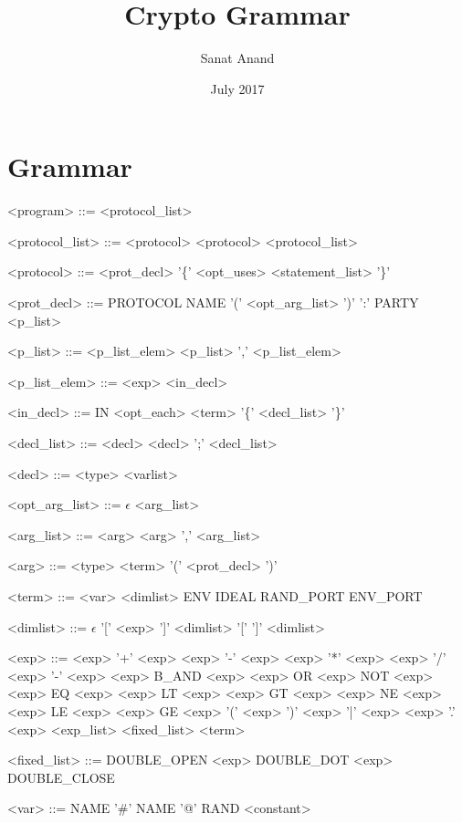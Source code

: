 \documentclass{article}
\title{Crypto Grammar}
\author{Sanat Anand}
\date{July 2017}
\begin{document}
\maketitle

\setlength{\grammarparsep}{4pt plus 1pt minus 1pt} %
\setlength{\grammarindent}{12em} %

\section{Grammar}

\begin{grammar}
<program> ::= <protocol\_list>

<protocol\_list> ::= <protocol> \alt <protocol> <protocol\_list>

<protocol> ::= <prot\_decl> '\{' <opt\_uses> <statement\_list> '\}'

<prot\_decl> ::= PROTOCOL NAME '(' <opt\_arg\_list> ')' ':' PARTY <p\_list>

<p\_list> ::= <p\_list\_elem> \alt <p\_list> ',' <p\_list\_elem>

<p\_list\_elem> ::= <exp> \alt <in\_decl>

<in\_decl> ::= IN <opt\_each> <term> '\{' <decl\_list> '\}'

<decl\_list> ::= <decl> \alt <decl> ';' <decl\_list>

<decl> ::= <type> <varlist>

<opt\_arg\_list> ::= $\epsilon$ \alt <arg\_list>

<arg\_list> ::= <arg> \alt <arg> ',' <arg\_list>

<arg> ::= <type> <term> \alt '(' <prot\_decl> ')'

<term> ::= <var> <dimlist> \alt ENV \alt IDEAL \alt RAND\_PORT \alt ENV\_PORT

<dimlist> ::= $\epsilon$ \alt '[' <exp> ']' <dimlist> \alt '[' ']' <dimlist>

<exp> ::= <exp> '+' <exp> \alt <exp> '-' <exp> \alt <exp> '*' <exp> \alt <exp> '/' <exp> \alt '-' <exp> \alt <exp> B\_AND <exp> \alt <exp> OR <exp> \alt NOT <exp> \alt <exp> EQ <exp> \alt <exp> LT <exp> \alt <exp> GT <exp> \alt <exp> NE <exp> \alt <exp> LE <exp> \alt <exp> GE <exp> \alt '(' <exp> ')' \alt <exp> '|' <exp> \alt <exp> '.' <exp> \alt <exp\_list> \alt <fixed\_list> \alt <term>

<fixed\_list> ::= DOUBLE\_OPEN <exp> DOUBLE\_DOT <exp> DOUBLE\_CLOSE

<var> ::= NAME \alt '\#' NAME \alt '@' \alt RAND \alt <constant>


\end{grammar}
\end{document}
